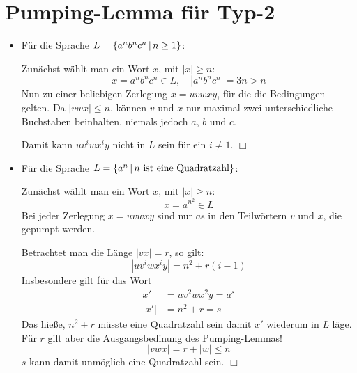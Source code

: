 \section{Pumping-Lemma für Typ-2}
\begin{itemize}
	\item
	Für die Sprache $L=\left\{ a^nb^nc^n \,\middle|\, n\geq 1 \right\}$:

	Zunächst wählt man ein Wort $x$, mit $|x|\geq n$:
	\begin{equation*}
		x=a^nb^nc^n \in L,\quad |a^nb^nc^n|=3n>n
	\end{equation*}
	Nun zu einer beliebigen Zerlegung $x=uvwxy$, für die die Bedingungen gelten. Da $|vwx|\leq n$, können $v$ und $x$ nur maximal zwei unterschiedliche Buchstaben beinhalten, niemals jedoch $a$, $b$ und $c$.

	Damit kann $uv^iwx^iy$ nicht in $L$ sein für ein $i\neq 1$. \hfill $\Box$
	\item
	Für die Sprache $L=\left\{ a^n \,\middle|\, n \text{ ist eine Quadratzahl} \right\}$:

	Zunächst wählt man ein Wort $x$, mit $|x|\geq n$:
	\begin{equation*}
		x=a^{n^2} \in L
	\end{equation*}
	Bei jeder Zerlegung $x=uvwxy$ sind nur $a$s in den Teilwörtern $v$ und $x$, die gepumpt werden.

	Betrachtet man die Länge $|vx|=r$, so gilt:
	\begin{equation*}
		|uv^iwx^iy|=n^2+r(i-1)
	\end{equation*}
	Insbesondere gilt für das Wort
	\begin{align*}
		x'&=uv^2wx^2y=a^s\\
		|x'|&=n^2+r=s
	\end{align*}
	Das hieße, $n^2+r$ müsste eine Quadratzahl sein damit $x'$ wiederum in $L$ läge.
  Für $r$ gilt aber die Ausgangsbedinung des Pumping-Lemmas!
	\begin{equation*}
		|vwx|=r+|w|\leq n
	\end{equation*}
	$s$ kann damit unmöglich eine Quadratzahl sein. \hfill $\Box$
\end{itemize}
